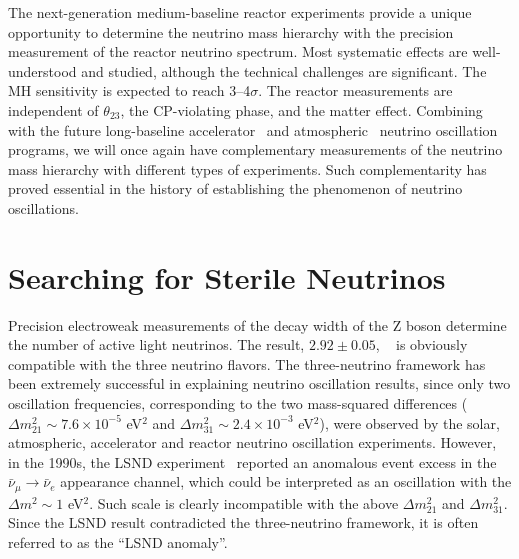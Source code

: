 \documentclass[aps,twocolumn,preprintnumbers,amsmath,superscriptaddress,amssymb,floats,nofootinbib]{revtex4-1}
\begin{document}
The next-generation medium-baseline reactor experiments provide a unique opportunity to determine the neutrino mass hierarchy with the precision measurement of the reactor neutrino spectrum.
Most systematic effects are well-understood and studied, although the technical challenges are significant.
The MH sensitivity is expected to reach 3--4$\sigma$.
The reactor measurements are independent of $\theta_{23}$, the CP-violating phase, and the matter effect.
Combining with the future long-baseline accelerator~\cite{LBNE,LBNO} and atmospheric~\cite{PINGU,ORCA} neutrino oscillation programs, we will once again have complementary measurements of the neutrino mass hierarchy with different types of experiments.
Such complementarity has proved essential in the history of establishing the phenomenon of neutrino oscillations.


\section{Searching for Sterile Neutrinos}

Precision electroweak measurements of the decay width of the Z boson
determine the number of active light neutrinos. The result, $2.92 \pm 0.05$,  ~\cite{EW-2005} is obviously compatible with the three neutrino flavors.
The three-neutrino framework has been extremely successful in explaining neutrino oscillation results, since only two oscillation frequencies, corresponding to the two mass-squared differences
($\Delta m_{21}^2\sim7.6\times10^{-5}$ eV$^2$ and $\Delta m_{31}^2 \sim2.4\times10^{-3}$ eV$^2$),
were observed by the solar, atmospheric, accelerator and reactor neutrino oscillation experiments.
However, in the 1990s, the LSND experiment~\cite{LSND1995,LSND2001} reported an anomalous
event excess in the $\bar\nu_\mu\rightarrow\bar\nu_e$ appearance channel, which could be interpreted as an oscillation with the $\Delta m^2\sim1$ eV$^2$.
Such scale is clearly incompatible with the above $\Delta m_{21}^2$ and $\Delta m_{31}^2$.
Since the LSND result contradicted the three-neutrino framework, it is often referred to as the ``LSND anomaly''.
\end{document}

